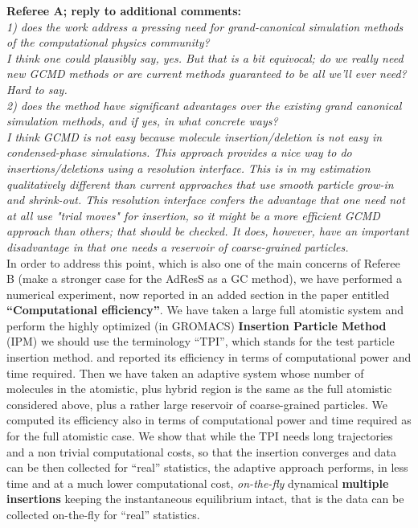 \documentclass[12pt]{article}
\newcommand{\bluec}[1]{{\color{blue} #1}}
\begin{document}
{\bf Referee A; reply to  additional comments:}\\
{\color{red} {\it 1) does the work address a pressing need for grand-canonical
simulation methods of the computational physics community?\\

I think one could plausibly say, yes. But that is a bit equivocal;
do we really need new GCMD methods or are current methods guaranteed
to be all we'll ever need? Hard to say.\\
2) does the method have significant advantages over the existing
grand canonical simulation methods, and if yes, in what concrete
ways?\\
I think GCMD is not easy because molecule insertion/deletion is not
easy in condensed-phase simulations. This approach provides a nice way
to do insertions/deletions using a resolution interface. This is in
my estimation qualitatively different than current approaches that use
smooth particle grow-in and shrink-out. This resolution interface
confers the advantage that one need not at all use "trial moves" for
insertion, so it might be a more efficient GCMD approach than others;
that should be checked. It does, however, have an important
disadvantage in that one needs a reservoir of coarse-grained
particles.}}\\
In order to address this point, which is also one of the main concerns of Referee B (make a stronger case for the AdResS as a GC method),
we have performed a numerical experiment, now reported in an added section in the paper entitled {\bf ``Computational efficiency''}.
We have taken a large full atomistic system and perform the highly optimized (in GROMACS) {\bf Insertion Particle Method} (IPM) \bluec{we should use the terminology ``TPI'', which stands for the test particle insertion method.} and reported its efficiency in terms of computational power and time required.
Then we have taken an adaptive system whose number of molecules in the atomistic, plus hybrid region is the same as the full atomistic considered above, plus a rather large reservoir of coarse-grained particles. We computed its efficiency also in terms of computational power and time required as for the full atomistic case.
We show that while the \bluec{TPI} needs long trajectories and a non trivial computational costs, so that the insertion converges and data can be then collected for ``real'' statistics, the adaptive approach performs, in less time and at a much lower computational cost, {\it on-the-fly} dynamical {\bf multiple insertions} keeping the instantaneous equilibrium intact, that is the data can be collected on-the-fly for ``real'' statistics.\\
\end{document}
